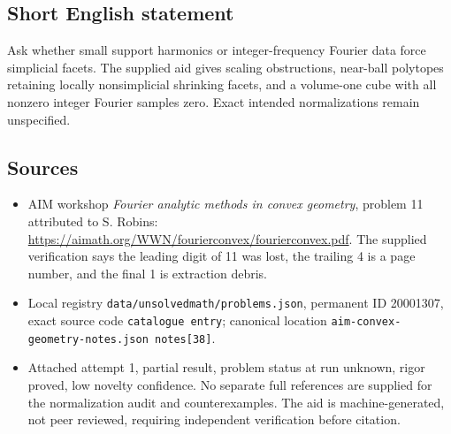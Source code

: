 \documentclass[11pt]{article}
\begin{document}
\subsection{Short English statement}
Ask whether small support harmonics or integer-frequency Fourier data force simplicial facets. The supplied aid gives scaling obstructions, near-ball polytopes retaining locally nonsimplicial shrinking facets, and a volume-one cube with all nonzero integer Fourier samples zero. Exact intended normalizations remain unspecified.
\subsection{Sources}
\begin{itemize}
\item AIM workshop \emph{Fourier analytic methods in convex geometry}, problem 11 attributed to S. Robins: \url{https://aimath.org/WWN/fourierconvex/fourierconvex.pdf}. The supplied verification says the leading digit of 11 was lost, the trailing 4 is a page number, and the final 1 is extraction debris.
\item Local registry \texttt{data/unsolvedmath/problems.json}, permanent ID 20001307, exact source code \texttt{catalogue entry}; canonical location \texttt{aim-convex-geometry-notes.json notes[38]}.
\item Attached attempt 1, partial result, problem status at run unknown, rigor proved, low novelty confidence. No separate full references are supplied for the normalization audit and counterexamples. The aid is machine-generated, not peer reviewed, requiring independent verification before citation.
\end{itemize}
\end{document}

